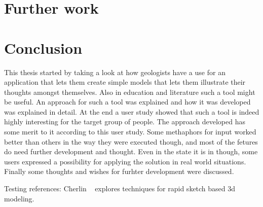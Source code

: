 \documentclass[a4paper,12pt]{report}
\begin{document}
\clearpage
\chapter{Further work}
\label{sec:further}

\clearpage
\chapter{Conclusion}
\label{sec:conclusion}
This thesis started by taking a look at how geologists have a use for an application that lets them create simple models that lets them illustrate their thoughts amongst themselves. Also in education and literature such a tool might be useful. An approach for such a tool was explained and how it was developed was explained in detail. At the end a user study showed that such a tool is indeed highly interesting for the target group of people. The approach developed has some merit to it according to this user study. Some methaphors for input worked better than others in the way they were executed though, and most of the fetures do need further development and thought. Even in the state it is in though, some users expressed a possibility for applying the solution in real world situations. Finally some thoughts and wishes for furhter development were discussed.



Testing references: Cherlin ~\cite{Cherlin:2005:SMF:1090122.1090145} explores techniques for rapid sketch based 3d modeling.


{}

\end{document}
